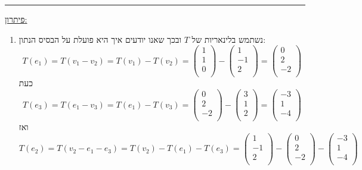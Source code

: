 \documentclass[12pt, a4paper]{article}
\begin{document}
\begin{enumerate}
    
    \secondQ
    \noindent\rule{\textwidth-30pt}{0.4pt}
    \underline{פיתרון:}
\begin{enumerate}
\item 
נשתמש בלינאריות של
$T$
ובכך שאנו יודעים איך היא פועלת על הבסיס הנתון:
$$T(e_1)=T(v_1-v_2)=T(v_1)-T(v_2)=\begin{pmatrix}
    1\\1\\0\\
    \end{pmatrix}-\begin{pmatrix}
        1\\-1\\2\\
\end{pmatrix}=
\begin{pmatrix}
    0\\2\\-2\\
\end{pmatrix}$$
כעת
$$T(e_3)=T(e_1-v_3)=T(e_1)-T(v_3)
=
\begin{pmatrix}
    0\\2\\-2\\
\end{pmatrix}-
\begin{pmatrix}
    3\\1\\2\\
\end{pmatrix}=\begin{pmatrix}
    -3\\1\\-4\\
\end{pmatrix}$$
ואז
$$T(e_2)=T(v_2-e_1-e_3)=T(v_2)-T(e_1)-T(e_3)=
\begin{pmatrix}
    1\\-1\\2\\
\end{pmatrix}-
\begin{pmatrix}
    0\\2\\-2\\
\end{pmatrix}
-\begin{pmatrix}
    -3\\1\\-4\\
\end{pmatrix}
$$
\end{enumerate}
\end{enumerate}
\end{document}
